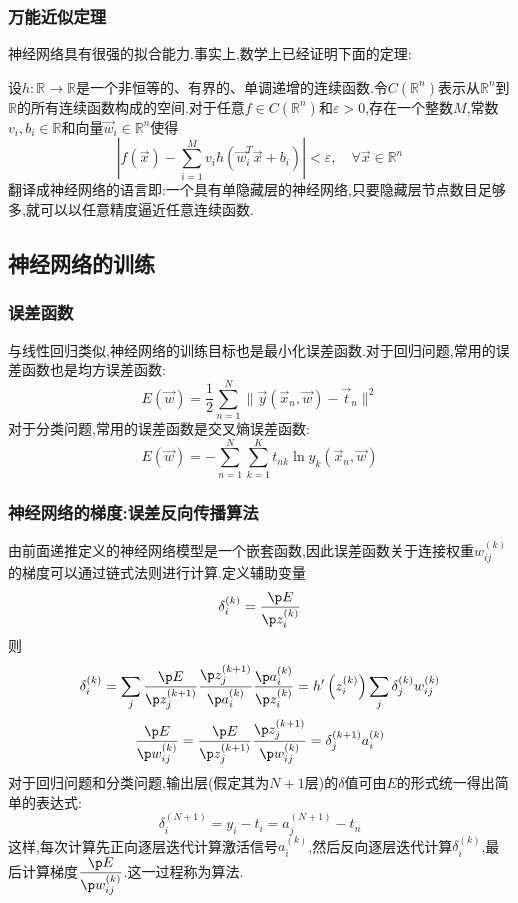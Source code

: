 \documentclass{ctexart}
\begin{document}
\subsubsection{万能近似定理}
神经网络具有很强的拟合能力.事实上,数学上已经证明下面的定理:
\begin{theorem}[万能近似定理]
    设$h:\mathbb{R}\to\mathbb{R}$是一个非恒等的、有界的、单调递增的连续函数.令$C\left(\mathbb{R}^n\right)$表示从$\mathbb{R}^n$到$\mathbb{R}$的所有连续函数构成的空间.对于任意$f\in C\left(\mathbb{R}^n\right)$和$\varepsilon>0$,存在一个整数$M$,常数$v_i,b_i\in\mathbb{R}$和向量$\vec{w}_i\in\mathbb{R}^n$使得
    \[\left|f(\vec{x})-\sum_{i=1}^{M}v_ih\left(\vec{w}_i^T\vec{x}+b_i\right)\right|<\varepsilon,\quad \forall \vec{x}\in \mathbb{R}^n\]
    翻译成神经网络的语言即:一个具有单隐藏层的神经网络,只要隐藏层节点数目足够多,就可以以任意精度逼近任意连续函数.
\end{theorem}
\subsection{神经网络的训练}
\subsubsection{误差函数}
与线性回归类似,神经网络的训练目标也是最小化误差函数.对于回归问题,常用的误差函数也是均方误差函数:
\[E(\vec{w})=\frac{1}{2}\sum_{n=1}^{N}\|\vec{y}(\vec{x}_n,\vec{w})-\vec{t}_n\|^2\]
对于分类问题,常用的误差函数是交叉熵误差函数:
\[E(\vec{w})=-\sum_{n=1}^{N}\sum_{k=1}^{K}t_{nk}\ln y_k(\vec{x}_n,\vec{w})\]
\subsubsection{神经网络的梯度:误差反向传播算法}
由前面递推定义的神经网络模型是一个嵌套函数,因此误差函数关于连接权重$w^{(k)}_{ij}$的梯度可以通过链式法则进行计算.定义辅助变量
\[\delta^{(k)}_i=\dfrac{\p E}{\p z^{(k)}_i}\]
则
\[\delta^{(k)}_i=\sum_j\dfrac{\p E}{\p z^{(k+1)}_j}\dfrac{\p z^{(k+1)}_j}{\p a^{(k)}_i}\dfrac{\p a^{(k)}_i}{\p z^{(k)}_i}=h'\left(z_i^{(k)}\right)\sum_{j}\delta_{j}^{(k)}w_{ij}^{(k)}\]
\[\dfrac{\p E}{\p w^{(k)}_{ij}}=\dfrac{\p E}{\p z^{(k+1)}_{j}}\dfrac{\p z^{(k+1)}_{j}}{\p w^{(k)}_{ij}}=\delta_{j}^{(k+1)}a_i^{(k)}\]
对于回归问题和分类问题,输出层(假定其为$N+1$层)的$\delta$值可由$E$的形式统一得出简单的表达式:
\[\delta_i^{(N+1)}=y_i-t_i=a_j^{(N+1)}-t_n\]
这样,每次计算先正向逐层迭代计算激活信号$a_i^{(k)}$,然后反向逐层迭代计算$\delta_i^{(k)}$,最后计算梯度$\dfrac{\p E}{\p w^{(k)}_{ij}}$.这一过程称为算法.
\end{document}
